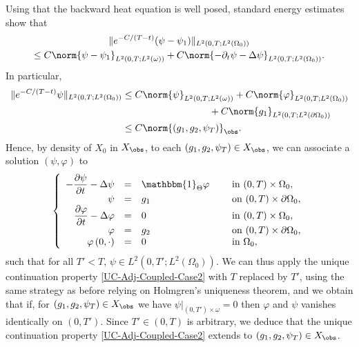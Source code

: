 Using that the backward heat equation is well posed, standard energy estimates show that
\begin{multline*}
\| e^{-C/(T-t)} (\psi - \psi_1) \|_{L^2(0,T; L^2(\Omega_0))}\\
\leq
C \norm{\psi- \psi_1}_{L^2(0,T; L^2(\omega))}
+
{C\norm{ - \partial_t \psi - \Delta \psi }_{L^2(0,T; L^2(\Omega_0))}}.
\end{multline*}
In particular,
\begin{align*}
\| e^{-C/(T-t)} \psi \|_{L^2(0,T; L^2(\Omega_0))}
& \leq
C \norm{\psi}_{L^2(0,T; L^2(\omega))}
+
{C\norm{ \varphi }_{L^2(0,T; L^2(\Omega_0))}}\\
&\hspace*{3.17cm}+
C \norm{g_1}_{L^2(0,T; L^2(\partial \Omega_0))}
\\
&\leq
C \norm{(g_1, g_2, \psi_T)}_{\obs}.
\end{align*}
Hence, by density of $X_0$ in $X_{\obs}$, to each $(g_1, g_2, \psi_T) \in X_{\obs}$, we can associate a solution $(\psi, \varphi)$ to
\begin{equation*}
\left\{
\begin{array}{rcll}
- \dfrac{\partial \psi}{\partial t}-\Delta \psi &=&\mathbbm{1}_{\Theta}\varphi \quad&\text{ in }(0,T) \times \Omega_0,
\\
\psi &=& g_1 &\text{ on }(0,T) \times \partial \Omega_0,
\\
\dfrac{\partial \varphi}{\partial t}-\Delta \varphi &=& 0 &\text{ in }(0,T) \times \Omega_0,
\\
\varphi &=& g_2 &\text{ on }(0,T) \times \partial \Omega_0,
\\
\varphi\left(0,\cdot\right) &=&0 &\text{ in }\Omega_0,
\end{array}
\right.
\end{equation*}
such that for all $T' < T$, $\psi \in L^2(0,T'; L^2(\Omega_0))$. We can thus apply the unique con\-ti\-nuation property \eqref{UC-Adj-Coupled-Case2} with $T$ replaced by $T'$, using the same strategy as before relying on Holmgren's uniqueness theorem, and we obtain that if, for $(g_1, g_2, \psi_T) \in X_{\obs}$ we have $\psi|_{(0,T') \times \omega} = 0$ then $\varphi$ and $\psi$ vanishes identically on $(0,T')$. Since $T' \in (0,T)$ is arbitrary, we deduce that the unique continuation property \eqref{UC-Adj-Coupled-Case2} extends to $(g_1, g_2, \psi_T) \in X_{\obs}$.

